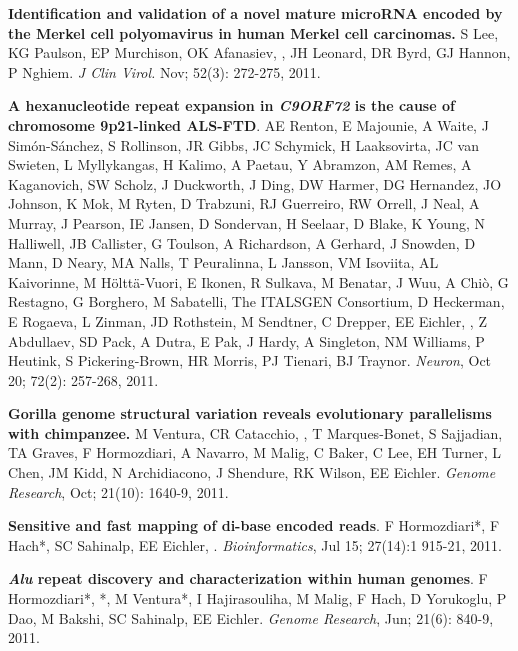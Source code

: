 \vspace{-.2cm}
    {\bf Identification and validation of a novel mature microRNA encoded by the Merkel cell polyomavirus in human Merkel cell carcinomas.}
    S Lee, KG Paulson, EP Murchison, OK Afanasiev, \calkan{}, JH Leonard, DR Byrd, GJ Hannon, 
    P Nghiem. {\em J Clin Virol.} Nov; 52(3): 272-275, 2011. 


\vspace{-.2cm}
    {\bf A hexanucleotide repeat expansion in \textit{C9ORF72} is the cause of chromosome 9p21-linked ALS-FTD}.  
    AE Renton, E Majounie, A Waite, J Simón-Sánchez, S Rollinson, JR Gibbs, JC Schymick, H Laaksovirta, JC van Swieten, L Myllykangas, 
    H Kalimo, A Paetau, Y Abramzon, AM Remes, A Kaganovich, SW Scholz, J Duckworth, J Ding, DW Harmer, DG Hernandez, JO Johnson, 
    K Mok, M Ryten, D Trabzuni, RJ Guerreiro, RW Orrell, J Neal, A Murray, J Pearson, IE Jansen, D Sondervan, H Seelaar, D Blake, 
    K Young, N Halliwell, JB Callister, G Toulson, A Richardson, A Gerhard, J Snowden, D Mann, D Neary, MA Nalls, T Peuralinna, 
    L Jansson, VM Isoviita, AL Kaivorinne, M Hölttä-Vuori, E Ikonen, R Sulkava, M Benatar, J Wuu, A Chiò, G Restagno, 
    G Borghero, M Sabatelli, The ITALSGEN Consortium, D Heckerman, E Rogaeva, L Zinman, JD Rothstein, M Sendtner, C Drepper, EE Eichler, 
    \calkan{}, Z Abdullaev, SD Pack, A Dutra, E Pak, J Hardy, A Singleton, NM Williams, P Heutink, S Pickering-Brown, 
    HR Morris, PJ Tienari, BJ Traynor. {\em Neuron}, Oct 20; 72(2): 257-268, 2011.
    
\vspace{-.2cm}
    {\bf Gorilla genome structural variation reveals evolutionary parallelisms with chimpanzee.}
    M Ventura, CR Catacchio, \calkan{}, T Marques-Bonet, S Sajjadian, TA Graves, F Hormozdiari, A Navarro, 
    M Malig, C Baker, C Lee, EH Turner, L Chen, JM Kidd, N Archidiacono, J Shendure, RK Wilson, EE Eichler.
    {\em Genome Research}, Oct; 21(10): 1640-9, 2011.

\vspace{-.2cm}
    {\bf Sensitive and fast mapping of di-base encoded reads}.
    F Hormozdiari*, F Hach*, SC Sahinalp, EE Eichler, \calkan{}.
    {\em Bioinformatics}, Jul 15; 27(14):1 915-21, 2011.

\vspace{-.2cm}
    {\bf \textit {Alu} repeat discovery and characterization within human genomes}.
    F Hormozdiari*, \calkan{}*, M Ventura*, I Hajirasouliha, M Malig, 
    F Hach, D Yorukoglu, P Dao, M Bakshi, SC Sahinalp, EE Eichler.
    {\em Genome Research}, Jun; 21(6): 840-9, 2011.

